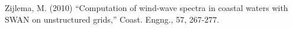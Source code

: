 



Zijlema, M. (2010) “Computation of wind-wave spectra in coastal waters with SWAN on unstructured grids,” Coast. Engng., 57, 267-277.

 
 
%
